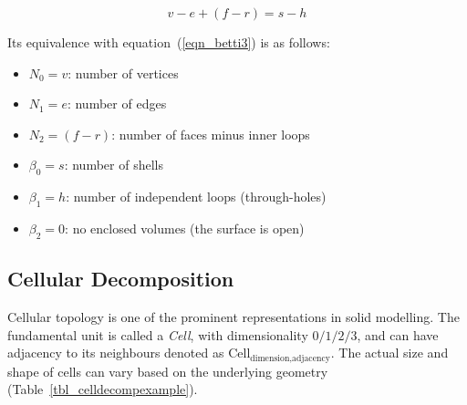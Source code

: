 \documentclass[11pt,a4paper]{article}
\begin{document}
\begin{equation}
  v - e + (f - r) = s - h
  \label{eqn_nonmanifold}
\end{equation}

Its equivalence with equation~(\ref{eqn_betti3}) is as follows:

\begin{itemize}[noitemsep,topsep=2pt,parsep=2pt,partopsep=2pt,label={}]
\item $N_{0} = v$: number of vertices
\item $N_{1} = e$: number of edges
\item $N_{2} = (f - r)$: number of faces minus inner loops
\item $\beta_{0} = s$: number of shells
\item $\beta_{1} = h$: number of independent loops (through-holes)
\item $\beta_{2} = 0$: no enclosed volumes (the surface is open)
\end{itemize}



\subsection{Cellular Decomposition}

Cellular topology is one of the prominent representations in solid modelling.
The fundamental unit is called a \emph{Cell}, with dimensionality $0/1/2/3$,
and can have adjacency to its neighbours denoted as
$\text{Cell}_{\text{dimension},\text{adjacency}}$. The actual size and shape
of cells can vary based on the underlying geometry
(Table~\ref{tbl_celldecompexample}).
\end{document}
